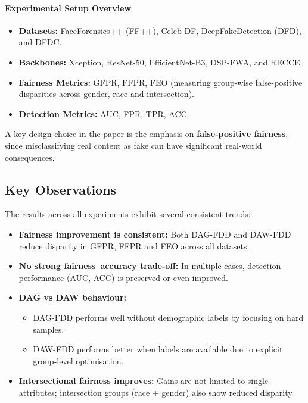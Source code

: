 \paragraph{Experimental Setup Overview}
\begin{itemize}
    \item \textbf{Datasets:} FaceForensics++ (FF++), Celeb-DF, DeepFakeDetection (DFD), and DFDC.
    \item \textbf{Backbones:} Xception, ResNet-50, EfficientNet-B3, DSP-FWA, and RECCE.
    \item \textbf{Fairness Metrics:} GFPR, FFPR, FEO (measuring group-wise false-positive disparities across gender, race and intersection).
    \item \textbf{Detection Metrics:} AUC, FPR, TPR, ACC
\end{itemize}

\noindent
A key design choice in the paper is the emphasis on \textbf{false-positive fairness}, since misclassifying real content as fake can have significant real-world consequences.

\subsection{Key Observations}
\label{subsec:ch4_main_results}

The results across all experiments exhibit several consistent trends:

\begin{itemize}
    \item \textbf{Fairness improvement is consistent:}  
    Both DAG-FDD and DAW-FDD reduce disparity in GFPR, FFPR and FEO across all datasets.

    \item \textbf{No strong fairness--accuracy trade-off:}  
    In multiple cases, detection performance (AUC, ACC) is preserved or even improved.

    \item \textbf{DAG vs DAW behaviour:}
    \begin{itemize}
        \item DAG-FDD performs well without demographic labels by focusing on hard samples.
        \item DAW-FDD performs better when labels are available due to explicit group-level optimisation.
    \end{itemize}

    \item \textbf{Intersectional fairness improves:}  
    Gains are not limited to single attributes; intersection groups (race + gender) also show reduced disparity.
\end{itemize}

